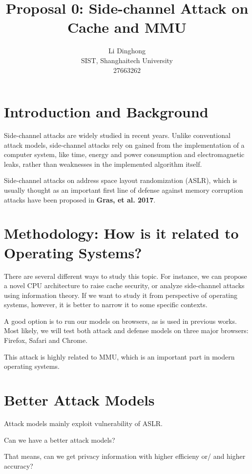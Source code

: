 \documentclass{article}
\title{Proposal 0: Side-channel Attack on Cache and MMU}
\author{Li Dinghong \\SIST, Shanghaitech University \\27663262}
\begin{document}
\maketitle
\large

\section{Introduction and Background}{
	Side-channel attacks are widely studied in recent years. Unlike conventional attack models, side-channel attacks rely on gained from the implementation of a computer system, like time, energy and power consumption and electromagnetic leaks, rather than weaknesses in the implemented algorithm itself. 

	Side-channel attacks on address space layout randomization (ASLR), which is usually thought as an important first line of defense against memory corruption attacks have been proposed in \textbf{Gras, et al. 2017}. 
}


\section{Methodology: How is it related to Operating Systems? }{
	There are several different ways to study this topic. For instance, we can propose a novel CPU architecture to raise cache security, or analyze side-channel attacks using information theory. If we want to study it from perspective of operating systems, however, it is better to narrow it to some specific contexts. 

	A good option is to run our models on browsers, as is used in previous works. Most likely, we will test both attack and defense models on three major browsers: Firefox, Safari and Chrome. 

	This attack is highly related to MMU, which is an important part in modern operating systems. 
}

\section{Better Attack Models}{
	Attack models mainly exploit vulnerability of ASLR. 

	Can we have a better attack models? 

	That means, can we get privacy information with higher efficieny or/ and higher accuracy? 
}
\end{document}
